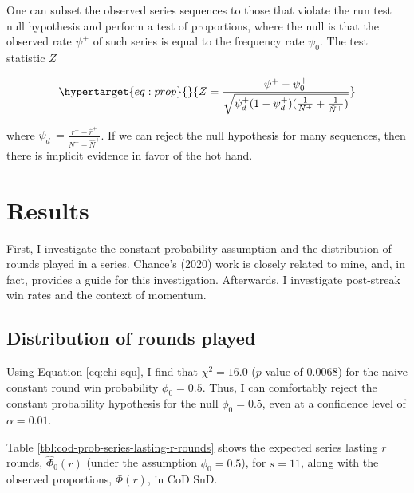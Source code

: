 \documentclass{article}
\begin{document}
One can subset the observed series sequences to those that violate the
run test null hypothesis and perform a test of proportions, where the
null is that the observed rate \(\psi^+\) of such series is equal to the
frequency rate \(\psi_0\). The test statistic \(Z\)

\begin{equation}\protect\hypertarget{eq:prop}{}{
Z = \frac{\psi^+ - \psi^+_0}{\sqrt{\psi^+_d (1 - \psi^+_d) ( \frac{1}{N^+} + \frac{1}{\hat{N}^+})}}
}\label{eq:prop}\end{equation}

where \(\psi^+_d = \frac{r^+ - \hat{r}^+}{N^+ - \hat{N}^+}\). If we can
reject the null hypothesis for many sequences, then there is implicit
evidence in favor of the hot hand.

\hypertarget{results}{%
\section{Results}\label{results}}

First, I investigate the constant probability assumption and the
distribution of rounds played in a series. Chance's (2020) work is
closely related to mine, and, in fact, provides a guide for this
investigation. Afterwards, I investigate post-streak win rates and the
context of momentum.

\hypertarget{distribution-of-rounds-played-1}{%
\subsection{Distribution of rounds
played}\label{distribution-of-rounds-played-1}}

Using Equation \ref{eq:chi-squ}, I find that \(\chi^2 = 16.0\)
(\(p\)-value of 0.0068) for the naive constant round win probability
\(\phi_0 = 0.5\). Thus, I can comfortably reject the constant
probability hypothesis for the null \(\phi_0 = 0.5\), even at a
confidence level of \(\alpha = 0.01\).

Table \ref{tbl:cod-prob-series-lasting-r-rounds} shows the expected
series lasting \(r\) rounds, \(\hat{\Phi}_0(r)\) (under the assumption
\(\phi_0 = 0.5\)), for \(s = 11\), along with the observed proportions,
\(\Phi(r)\), in CoD SnD.
\end{document}
